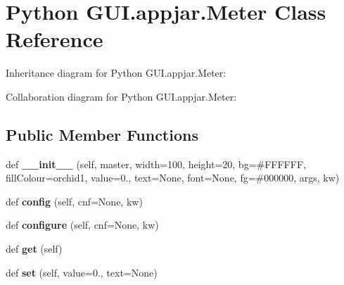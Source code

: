 \hypertarget{class_python_01_g_u_i_1_1appjar_1_1_meter}{}\section{Python G\+U\+I.\+appjar.\+Meter Class Reference}
\label{class_python_01_g_u_i_1_1appjar_1_1_meter}


Inheritance diagram for Python G\+U\+I.\+appjar.\+Meter\+:


Collaboration diagram for Python G\+U\+I.\+appjar.\+Meter\+:
\subsection*{Public Member Functions}
\begin{DoxyCompactItemize}
\item 
\mbox{\label{class_python_01_g_u_i_1_1appjar_1_1_meter_aa3781c83d89633cc0df7492e101a289e}} 
def {\bfseries \+\_\+\+\_\+init\+\_\+\+\_\+} (self, master, width=100, height=20, bg=\textquotesingle{}\#F\+F\+F\+F\+FF\textquotesingle{}, fill\+Colour=\textquotesingle{}orchid1\textquotesingle{}, value=0., text=None, font=None, fg=\textquotesingle{}\#000000\textquotesingle{}, args, kw)
\item 
\mbox{\label{class_python_01_g_u_i_1_1appjar_1_1_meter_a13fc2284a6336c76463cb7f483682d41}} 
def {\bfseries config} (self, cnf=None, kw)
\item 
\mbox{\label{class_python_01_g_u_i_1_1appjar_1_1_meter_adb525179fa40c36058e1a678e2008f31}} 
def {\bfseries configure} (self, cnf=None, kw)
\item 
\mbox{\label{class_python_01_g_u_i_1_1appjar_1_1_meter_a6a32d8244ef272d91c47f0c1762d4483}} 
def {\bfseries get} (self)
\item 
\mbox{\label{class_python_01_g_u_i_1_1appjar_1_1_meter_a2b8f7e3f7178292fa2ef68d4ee819f17}} 
def {\bfseries set} (self, value=0., text=None)
\item 
\mbox{\label{class_python_01_g_u_i_1_1appjar_1_1_meter_af1f21ed33b1800ddebca54454ab1631f}} 

\end{DoxyCompactItemize}
